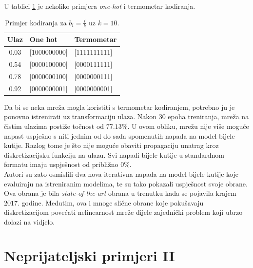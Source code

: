 \documentclass[utf8, diplomski]{fer}
\begin{document}
U tablici \ref{example_encoding} je nekoliko primjera \textit{one-hot} i termometar kodiranja.
\begin{table}[H]
\centering
\begin{tabular}{@{}cll@{}}
\toprule
Ulaz & One hot & Termometar\\ \midrule
0.03 & [1000000000] & [1111111111] \\
0.54 & [0000100000] & [0000111111] \\ 
0.78 & [0000000100] & [0000000111] \\ 
0.92 & [0000000001] & [0000000001] \\ \bottomrule
\end{tabular}
\caption{Primjer kodiranja za $b_{i} = \frac{i}{k}$ uz $k = 10$.}\label{example_encoding}
\end{table}
\par
Da bi se neka mreža mogla koristiti s termometar kodiranjem, potrebno ju je ponovno istrenirati uz transformaciju ulaza. Nakon $30$ epoha treniranja, mreža na čistim ulazima postiže točnost od $77.13\%$. U ovom obliku, mrežu nije više moguće napast uspješno s niti jednim od do sada spomenutih napada na model bijele kutije. Razlog tome je što nije moguće obaviti propagaciju unatrag kroz diskretizacijsku funkciju na ulazu. Svi napadi bijele kutije u standardnom formatu imaju uspješnost od približno $0\%$. \\
Autori su zato osmislili dva nova iterativna napada na model bijele kutije koje evaluiraju na istreniranim modelima, te su tako pokazali uspješnost svoje obrane. Ova obrana je bila \textit{state-of-the-art} obrana u trenutku kada se pojavila krajem $2017.$ godine. Međutim, ova i mnoge slične obrane koje pokušavaju diskretizacijom povećati nelinearnost mreže dijele zajednički problem koji ubrzo dolazi na vidjelo.

\chapter{Neprijateljski primjeri II}
\end{document}
